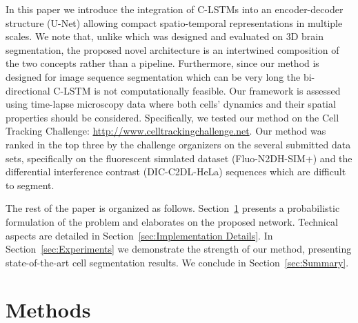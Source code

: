 \documentclass{article}
\begin{document}
In this paper we introduce the integration of C-LSTMs into an encoder-decoder structure (U-Net) allowing compact spatio-temporal representations in multiple scales. 
We note that, unlike \cite{chen2016combining} which was designed and evaluated on 3D brain segmentation, the proposed novel architecture is an intertwined composition of the two concepts rather than a pipeline. Furthermore, since our method is designed for image sequence segmentation which can be very long the bi-directional C-LSTM is not computationally feasible.  Our framework is assessed using time-lapse microscopy data where both cells' dynamics and their spatial properties should be considered. Specifically, we tested our method on the Cell Tracking Challenge: \url{http://www.celltrackingchallenge.net}. Our method was ranked in the top three by the challenge organizers on the several submitted data sets, specifically on the fluorescent  simulated dataset (Fluo-N2DH-SIM+) and the  differential interference contrast (DIC-C2DL-HeLa)  sequences which are difficult to segment. 

The rest of the paper is organized as follows. Section~\ref{sec:Proposed-Algorithm} presents a probabilistic formulation of the problem and elaborates on the proposed network. Technical aspects are detailed in Section~\ref{sec:Implementation Details}. In Section~\ref{sec:Experiments} we demonstrate the strength of our method, presenting state-of-the-art cell segmentation results. We conclude in Section~\ref{sec:Summary}.



\section{Methods}\label{sec:Proposed-Algorithm}
\end{document}
